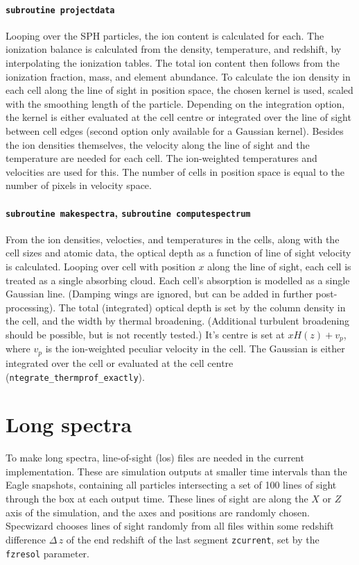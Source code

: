 \documentclass{report}
\newcommand{\param}[1]{{\tt #1}}
\begin{document}
\paragraph{{\tt subroutine projectdata}}
Looping over the SPH particles, the ion content is calculated for each. The ionization balance is calculated from the density, temperature, and redshift, by interpolating the ionization tables. The total ion content then follows from the ionization fraction, mass, and element abundance. To calculate the ion density in each cell along the line of sight in position space, the chosen kernel is used, scaled with the smoothing length of the particle. Depending on the integration option, the kernel is either evaluated at the cell centre or integrated over the line of sight between cell edges (second option only available for a Gaussian kernel). Besides the ion densities themselves, the velocity along the line of sight and the temperature are needed for each cell. The ion-weighted temperatures and velocities are used for this. The number of cells in position space is equal to the number of pixels in velocity space.

\paragraph{{\tt subroutine makespectra}, {\tt subroutine computespectrum}}
From the ion densities, velocties, and temperatures in the cells, along with the cell sizes and atomic data, the optical depth as a function of line of sight velocity is calculated. 
Looping over cell with position $x$ along the line of sight, each cell is treated as a single absorbing cloud. 
Each cell's absorption is modelled as a single Gaussian line. (Damping wings are ignored, but can be added in further post-processing). The total (integrated) optical depth is set by the column density in the cell, and the width by thermal broadening. (Additional turbulent broadening should be possible, but is not recently tested.) It's centre is set at $x H(z) + v_p$, where $v_p$ is the ion-weighted peculiar velocity in the cell. The Gaussian is either integrated over the cell or evaluated at the cell centre (\param{ntegrate\_thermprof\_exactly}).
 

\section{Long spectra}
To make long spectra, line-of-sight (los) files are needed in the current implementation. These are simulation outputs at smaller time intervals than the Eagle snapshots, containing all particles intersecting a set of 100 lines of sight through the box at each output time. These lines of sight are along the $X$ or $Z$ axis of the simulation, and the axes and positions are randomly chosen. Specwizard chooses lines of sight randomly from all files within some redshift difference $\Delta \, z$ of the end redshift of the last segment \param{zcurrent}, set by the \param{fzresol} parameter.
\end{document}
